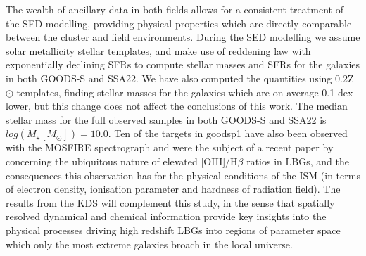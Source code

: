 \documentclass[fleqn,usenatbib]{mn2e}
\begin{document}
The wealth of ancillary data in both fields allows for a consistent treatment of the SED modelling, providing physical properties which are directly comparable between the cluster and field environments.
During the SED modelling we assume solar metallicity stellar templates, and make use of \cite{Calzetti2000} reddening law with exponentially declining SFRs to compute stellar masses and SFRs for the galaxies in both GOODS-S and SSA22.
We have also computed the quantities using 0.2Z$\odot$ templates, finding stellar masses for the galaxies which are on average 0.1 dex lower, but this change does not affect the conclusions of this work.
The median stellar mass for the full observed samples in both GOODS-S and SSA22 is $log(M_{\star}[M_{\odot}]) = 10.0$.
Ten of the targets in goodsp1 have also been observed with the MOSFIRE spectrograph and were the subject of a recent paper by \cite{Holden2016} concerning the ubiquitous nature of elevated [OIII]/H$\beta$ ratios in LBGs, and the consequences this observation has for the physical conditions of the ISM (in terms of electron density, ionisation parameter and hardness of radiation field).
The results from the KDS will complement this study, in the sense that spatially resolved dynamical and chemical information provide key insights into the physical processes driving high redshift LBGs into regions of parameter space which only the most extreme galaxies broach in the local universe.
\end{document}
